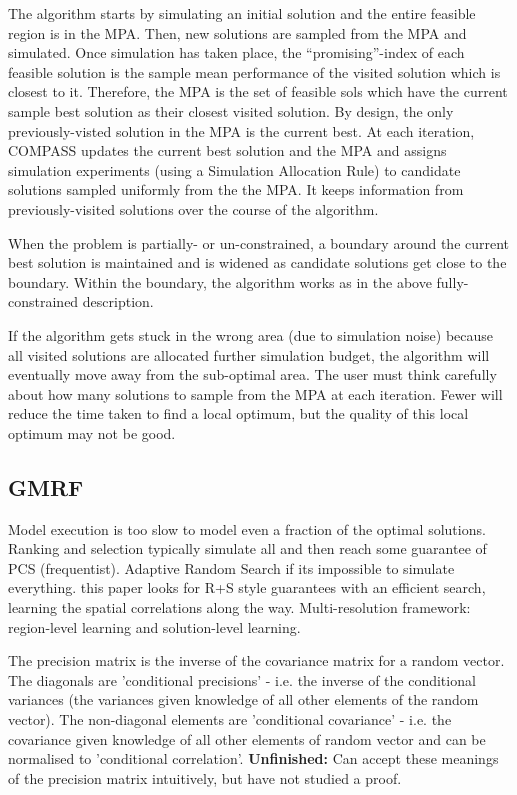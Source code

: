 \documentclass{article}
\begin{document}
The algorithm starts by simulating an initial solution and the entire feasible region is in the MPA. Then, new solutions are sampled from the MPA and simulated. Once simulation has taken place, the ``promising''-index of each feasible solution is the sample mean performance of the visited solution which is closest to it. Therefore, the MPA is the set of feasible sols which have the current sample best solution as their closest visited solution. By design, the only previously-visted solution in the MPA is the current best. At each iteration, COMPASS updates the current best solution and the MPA and assigns simulation experiments (using a Simulation Allocation Rule) to candidate solutions sampled uniformly from the the MPA. It keeps information from previously-visited solutions over the course of the algorithm.   \newline

When the problem is partially- or un-constrained, a boundary around the current best solution is maintained and is widened as candidate solutions get close to the boundary. Within the boundary, the algorithm works as in the above fully-constrained description. \newline

If the algorithm gets stuck in the wrong area (due to simulation noise) because all visited solutions are allocated further simulation budget, the algorithm will eventually move away from the sub-optimal area. The user must think carefully about how many solutions to sample from the MPA at each iteration. Fewer will reduce the time taken to find a local optimum, but the quality of this local optimum may not be good. 

\subsection{GMRF}

Model execution is too slow to model even a fraction of the optimal solutions. Ranking and selection typically simulate all and then reach some guarantee of PCS (frequentist). Adaptive Random Search if its impossible to simulate everything. this paper looks for R+S style guarantees with an efficient search, learning the spatial correlations along the way. Multi-resolution framework: region-level learning and solution-level learning. \newline

The precision matrix is the inverse of the covariance matrix for a random vector. The diagonals are 'conditional precisions' - i.e. the inverse of the conditional variances (the variances given knowledge of all other elements of the random vector). The non-diagonal elements are 'conditional covariance' - i.e. the covariance given knowledge of all other elements of random vector and can be normalised to 'conditional correlation'. \textbf{Unfinished: } Can accept these meanings of the precision matrix intuitively, but have not studied a proof. \newline
\end{document}
